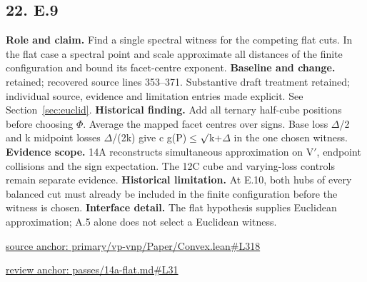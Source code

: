 \documentclass[11pt,letterpaper]{article}
\theoremstyle{definition}\newtheorem{definition}[theorem]{Definition}\newtheorem{example}[theorem]{Example}
\theoremstyle{remark}\newtheorem{remark}[theorem]{Remark}
\begin{document}
\subsection*{22. E.9}
\textbf{Role and claim.} Find a single spectral witness for the competing flat cuts. In the flat case a spectral point and scale approximate all distances of the finite configuration and bound its facet-centre exponent.
\textbf{Baseline and change.} retained; recovered source lines 353--371. Substantive draft treatment retained; individual source, evidence and limitation entries made explicit. See Section~\ref{sec:euclid}.
\textbf{Historical finding.} Add all ternary half-cube positions before choosing \ensuremath{\Phi}. Average the mapped facet centres over signs. Base loss \ensuremath{\Delta}/2 and k midpoint losses \ensuremath{\Delta}/(2k) give c g(P)\ensuremath{\le}\ensuremath{\sqrt{\vphantom{x}}}k+\ensuremath{\Delta} in the one chosen witness.
\textbf{Evidence scope.} 14A reconstructs simultaneous approximation on V\ensuremath{\prime}, endpoint collisions and the sign expectation. The 12C cube and varying-loss controls remain separate evidence.
\textbf{Historical limitation.} At E.10, both hubs of every balanced cut must already be included in the finite configuration before the witness is chosen.
\textbf{Interface detail.} The flat hypothesis supplies Euclidean approximation; A.5 alone does not select a Euclidean witness.
\par\href{https://github.com/nousentllc/VP-VNP-Review/blob/8a7976933b6b2b4ffda1ad3a0dfb5fc6b6f023e8/primary/vp-vnp/Paper/Convex.lean\#L318}{source anchor: primary/vp-vnp/Paper/Convex.lean\#L318}
\par\href{https://github.com/nousentllc/VP-VNP-Review/blob/8a7976933b6b2b4ffda1ad3a0dfb5fc6b6f023e8/passes/14a-flat.md\#L31}{review anchor: passes/14a-flat.md\#L31}
\goodbreak
\end{document}
